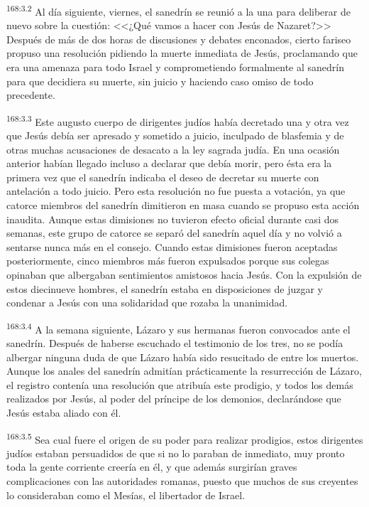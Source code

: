 \par 
\textsuperscript{168:3.2} Al día siguiente, viernes, el sanedrín se reunió a la una para deliberar de nuevo sobre la cuestión: <<¿Qué vamos a hacer con Jesús de Nazaret?>> Después de más de dos horas de discusiones y debates enconados, cierto fariseo propuso una resolución pidiendo la muerte inmediata de Jesús, proclamando que era una amenaza para todo Israel y comprometiendo formalmente al sanedrín para que decidiera su muerte, sin juicio y haciendo caso omiso de todo precedente.

\par 
\textsuperscript{168:3.3} Este augusto cuerpo de dirigentes judíos había decretado una y otra vez que Jesús debía ser apresado y sometido a juicio, inculpado de blasfemia y de otras muchas acusaciones de desacato a la ley sagrada judía. En una ocasión anterior habían llegado incluso a declarar que debía morir, pero ésta era la primera vez que el sanedrín indicaba el deseo de decretar su muerte con antelación a todo juicio. Pero esta resolución no fue puesta a votación, ya que catorce miembros del sanedrín dimitieron en masa cuando se propuso esta acción inaudita. Aunque estas dimisiones no tuvieron efecto oficial durante casi dos semanas, este grupo de catorce se separó del sanedrín aquel día y no volvió a sentarse nunca más en el consejo. Cuando estas dimisiones fueron aceptadas posteriormente, cinco miembros más fueron expulsados porque sus colegas opinaban que albergaban sentimientos amistosos hacia Jesús. Con la expulsión de estos diecinueve hombres, el sanedrín estaba en disposiciones de juzgar y condenar a Jesús con una solidaridad que rozaba la unanimidad.

\par 
\textsuperscript{168:3.4} A la semana siguiente, Lázaro y sus hermanas fueron convocados ante el sanedrín. Después de haberse escuchado el testimonio de los tres, no se podía albergar ninguna duda de que Lázaro había sido resucitado de entre los muertos. Aunque los anales del sanedrín admitían prácticamente la resurrección de Lázaro, el registro contenía una resolución que atribuía este prodigio, y todos los demás realizados por Jesús, al poder del príncipe de los demonios, declarándose que Jesús estaba aliado con él.

\par 
\textsuperscript{168:3.5} Sea cual fuere el origen de su poder para realizar prodigios, estos dirigentes judíos estaban persuadidos de que si no lo paraban de inmediato, muy pronto toda la gente corriente creería en él, y que además surgirían graves complicaciones con las autoridades romanas, puesto que muchos de sus creyentes lo consideraban como el Mesías, el libertador de Israel.

